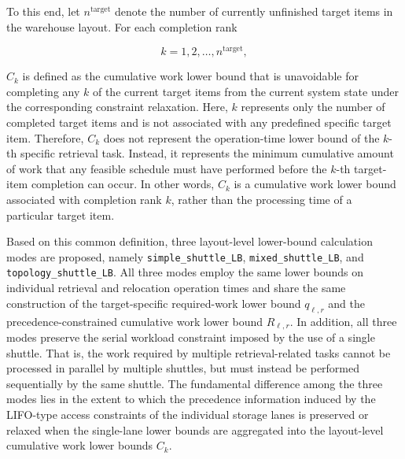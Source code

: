 To this end, let \(n^{\mathrm{target}}\) denote the number of currently
unfinished target items in the warehouse layout. For each completion rank

\[
k
=
1,2,\ldots,n^{\mathrm{target}},
\]

\(C_k\) is defined as the cumulative work lower bound that is unavoidable for
completing any \(k\) of the current target items from the current system state
under the corresponding constraint relaxation. Here, \(k\) represents only the
number of completed target items and is not associated with any predefined
specific target item. Therefore, \(C_k\) does not represent the operation-time
lower bound of the \(k\)-th specific retrieval task. Instead, it represents the
minimum cumulative amount of work that any feasible schedule must have
performed before the \(k\)-th target-item completion can occur. In other words,
\(C_k\) is a cumulative work lower bound associated with completion rank \(k\),
rather than the processing time of a particular target item.

Based on this common definition, three layout-level lower-bound calculation
modes are proposed, namely \texttt{simple\_shuttle\_LB},
\texttt{mixed\_shuttle\_LB}, and \texttt{topology\_shuttle\_LB}. All three
modes employ the same lower bounds on individual retrieval and relocation
operation times and share the same construction of the target-specific
required-work lower bound \(q_{\ell,r}\) and the precedence-constrained
cumulative work lower bound \(R_{\ell,r}\). In addition, all three modes
preserve the serial workload constraint imposed by the use of a single
shuttle. That is, the work required by multiple retrieval-related tasks cannot
be processed in parallel by multiple shuttles, but must instead be performed
sequentially by the same shuttle. The fundamental difference among the three
modes lies in the extent to which the precedence information induced by the
LIFO-type access constraints of the individual storage lanes is preserved or
relaxed when the single-lane lower bounds are aggregated into the layout-level
cumulative work lower bounds \(C_k\).

